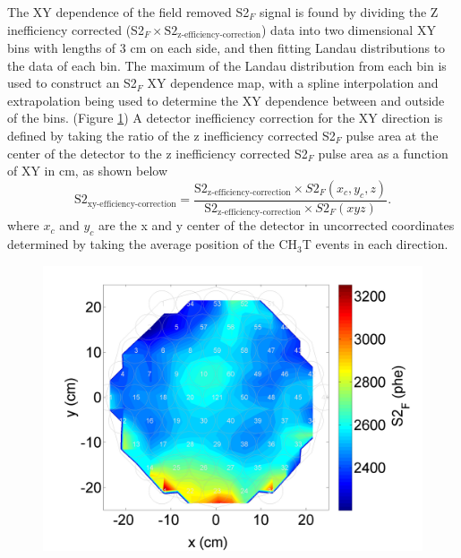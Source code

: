 The XY dependence of the field removed S2$_F$ signal is found by dividing the Z inefficiency corrected (S2$_F \times \mbox{S}2_{\mbox{z-efficiency-correction}}$) data into two dimensional XY bins with lengths of 3 cm on each side, and then fitting Landau distributions to the data of each bin.  The maximum of the Landau distribution from each bin is used to construct an S2$_F$ XY dependence map, with a spline interpolation and extrapolation being used to determine the XY dependence between and outside of the bins. (Figure \ref{fig:TritXYDep}) A detector inefficiency correction for the XY direction is defined by taking the ratio of the z inefficiency corrected S2$_F$ pulse area at the center of the detector to the z inefficiency corrected S2$_F$ pulse area as a function of XY in cm, as shown below
\begin{equation}\label{s2xycorr_eq}
\mbox{S}2_{\mbox{xy-efficiency-correction}} = \frac{\mbox{S}2_{\mbox{z-efficiency-correction}}\times S2_F(x_c,y_c,z)}{\mbox{S}2_{\mbox{z-efficiency-correction}}\times S2_F(xyz)}.
\end{equation} 
where $x_c$ and $y_c$ are the x and y center of the detector in uncorrected coordinates determined by taking the average position of the CH$_3$T events in each direction.

\begin{figure}[!h]
\includegraphics[scale=0.5]{Run04Corrections/CH3T_S2_XYDep.png}
 \label{fig:TritXYDep}
\end{figure}


